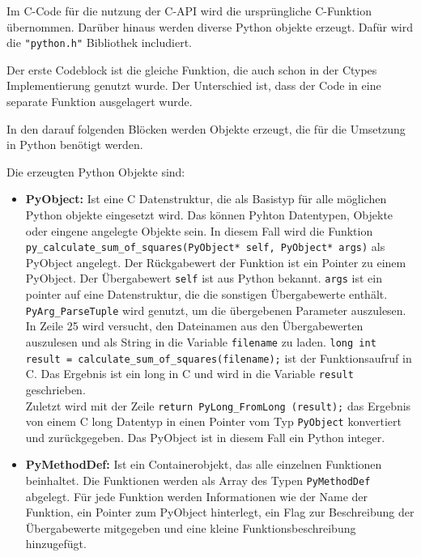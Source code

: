 \documentclass[a4paper, parskip=half]{scrartcl}
\begin{document}
Im C-Code für die nutzung der C-API wird die ursprüngliche C-Funktion übernommen. Darüber hinaus werden diverse Python objekte erzeugt. Dafür wird die \lstinline{"python.h"} Bibliothek includiert. 



Der erste Codeblock ist die gleiche Funktion, die auch schon in der Ctypes Implementierung genutzt wurde. Der Unterschied ist, dass der Code in eine separate Funktion ausgelagert wurde.

In den darauf folgenden Blöcken werden Objekte erzeugt, die für die Umsetzung in Python benötigt werden. 

Die erzeugten Python Objekte sind:
\begin{itemize}
    \item \textbf{PyObject:} Ist eine C Datenstruktur, die als Basistyp für alle möglichen Python objekte eingesetzt wird. Das können Pyhton Datentypen, Objekte oder eingene angelegte Objekte sein. In diesem Fall wird die Funktion
    \lstinline{py_calculate_sum_of_squares(PyObject* self, PyObject* args)} als PyObject angelegt. Der Rückgabewert der Funktion ist ein Pointer zu einem PyObject. Der Übergabewert \lstinline{self} ist aus Python bekannt. \lstinline{args} ist ein pointer auf eine Datenstruktur, die die sonstigen Übergabewerte enthält.
    \lstinline{PyArg_ParseTuple} wird genutzt, um die übergebenen Parameter auszulesen. \\
    In Zeile 25 wird versucht, den Dateinamen aus den Übergabewerten auszulesen und als String in die Variable \lstinline{filename} zu laden. \lstinline{long int result = calculate_sum_of_squares(filename);} ist der Funktionsaufruf in C. Das Ergebnis ist ein long in C und wird in die Variable \lstinline{result} geschrieben. \\
    Zuletzt wird mit der Zeile \lstinline{return PyLong_FromLong (result);} das Ergebnis von einem C long Datentyp in einen Pointer vom Typ \lstinline{PyObject} konvertiert und zurückgegeben. Das PyObject ist in diesem Fall ein Python integer. \cite{c_api_objekte}
    \item \textbf{PyMethodDef:} Ist ein Containerobjekt, das alle einzelnen Funktionen beinhaltet. Die Funktionen werden als Array des Typen \lstinline{PyMethodDef} abgelegt. Für jede Funktion werden Informationen wie der Name der Funktion, ein Pointer zum PyObject hinterlegt, ein Flag zur Beschreibung der Übergabewerte mitgegeben und eine kleine Funktionsbeschreibung hinzugefügt.\\

\end{itemize}
\end{document}
